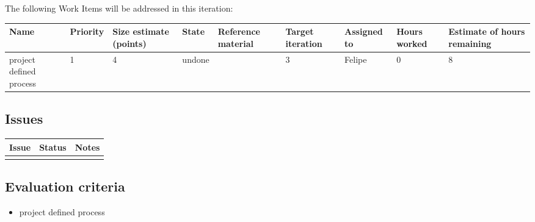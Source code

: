 The following Work Items will be addressed in this iteration:

\begin{adjustbox}{width=\textwidth}
\noindent\begin{tabular}{|l|l|l|l|l|l|l|l|l|}
\hline
Name & Priority & Size estimate (points) & State & Reference material & Target iteration & Assigned to & Hours worked & Estimate of hours remaining \\ \hline
project defined process &  1 & 4 & undone & & 3 & Felipe & 0 & 8 \\ \hline
\end{tabular}
\end{adjustbox}

\subsection*{Issues}


\noindent\begin{tabular}{|l|l|l|}
\hline
Issue & Status & Notes \\
\hline
 &  & \\
\hline
\end{tabular}

\subsection*{Evaluation criteria}


\begin{itemize}
	\item project defined process 
\end{itemize}

